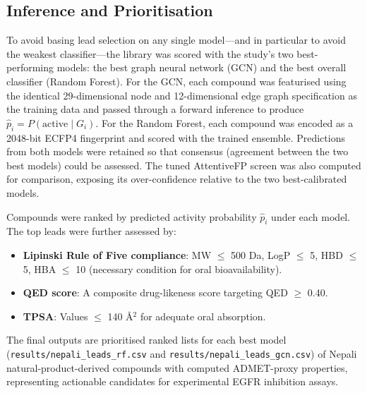 \subsection{Inference and Prioritisation}

To avoid basing lead selection on any single model---and in particular to avoid the
weakest classifier---the library was scored with the study's two best-performing
models: the best graph neural network (GCN) and the best overall classifier (Random
Forest). For the GCN, each compound was featurised using the identical 29-dimensional
node and 12-dimensional edge graph specification as the training data and passed
through a forward inference to produce $\hat{p}_i = P(\text{active} \mid G_i)$. For
the Random Forest, each compound was encoded as a 2048-bit ECFP4 fingerprint and
scored with the trained ensemble. Predictions from both models were retained so that
consensus (agreement between the two best models) could be assessed. The tuned
AttentiveFP screen was also computed for comparison, exposing its over-confidence
relative to the two best-calibrated models.

Compounds were ranked by predicted activity probability $\hat{p}_i$ under each model.
The top leads were further assessed by:
\begin{itemize}
    \item \textbf{Lipinski Rule of Five compliance}: MW $\leq$ 500 Da, LogP $\leq$ 5,
          HBD $\leq$ 5, HBA $\leq$ 10 (necessary condition for oral bioavailability).
    \item \textbf{QED score}: A composite drug-likeness score targeting QED $\geq$ 0.40.
    \item \textbf{TPSA}: Values $\leq$ 140 \AA$^2$ for adequate oral absorption.
\end{itemize}

The final outputs are prioritised ranked lists for each best model
(\texttt{results/nepali\_leads\_rf.csv} and \texttt{results/nepali\_leads\_gcn.csv})
of Nepali natural-product-derived compounds with computed ADMET-proxy properties,
representing actionable candidates for experimental EGFR inhibition assays.

